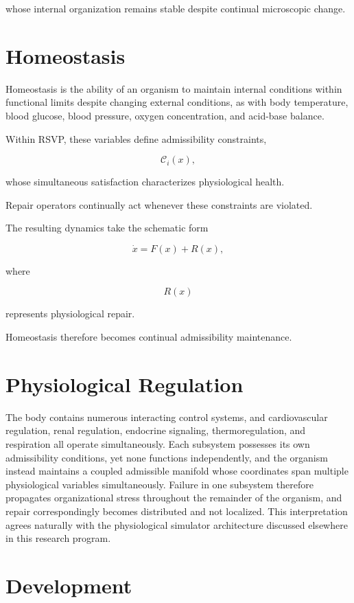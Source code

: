 \documentclass[11pt,oneside]{book}
\numberwithin{equation}{chapter}
\theoremstyle{definition}
\theoremstyle{plain}
\begin{document}
whose internal organization remains stable despite continual microscopic
change.

\section{Homeostasis}

Homeostasis is the ability of an organism to maintain internal conditions within functional limits despite changing external conditions, as with body temperature, blood glucose, blood pressure, oxygen concentration, and acid-base balance.

Within RSVP, these variables define admissibility constraints,

\[
\mathcal C_i(x),
\]

whose simultaneous satisfaction characterizes physiological health.

Repair operators continually act whenever these constraints are violated.

The resulting dynamics take the schematic form

\[
\dot x
=
F(x)
+
R(x),
\]

where

\[
R(x)
\]

represents physiological repair.

Homeostasis therefore becomes continual admissibility maintenance.

\section{Physiological Regulation}

The body contains numerous interacting control systems, and cardiovascular regulation, renal regulation, endocrine signaling, thermoregulation, and respiration all operate simultaneously. Each subsystem possesses its own admissibility conditions, yet none functions independently, and the organism instead maintains a coupled admissible manifold whose coordinates span multiple physiological variables simultaneously. Failure in one subsystem therefore propagates organizational stress throughout the remainder of the organism, and repair correspondingly becomes distributed and not localized. This interpretation agrees naturally with the physiological simulator architecture discussed elsewhere in this research program.

\section{Development}
\end{document}
